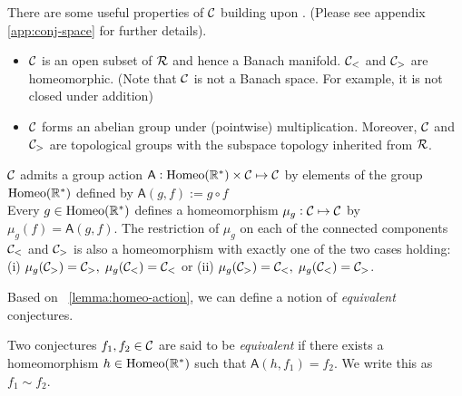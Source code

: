 There are some useful properties of $\mathcal{C}$ building upon \cite{mishraConjGen2023}. (Please see appendix \ref{app:conj-space} for further details).
\begin{itemize}
    \item $\mathcal{C}$ is an open subset of $\mathcal{R}$ and hence a Banach manifold. $\mathcal{C}_{<}$ and $\mathcal{C}_{>}$ are homeomorphic. (Note that $\mathcal{C}$ is not a Banach space. For example, it is not closed under addition)
    \item $\mathcal{C}$ forms an abelian group under (pointwise) multiplication. Moreover, $\mathcal{C}$ and $\mathcal{C}_{>}$ are topological groups with the subspace topology inherited from $\mathcal{R}$. 
\end{itemize}

\begin{lemma}
    \label{lemma:homeo-action}
    $\mathcal{C}$ admits a group action $\mathsf{A}: \text{Homeo}(\mathbb{R}^*)\times\mathcal{C}\mapsto\mathcal{C}$ by elements of the group $\text{Homeo}(\mathbb{R}^*)$ defined by $\mathsf{A}(g,f) := g\circ f$\\
    Every $g\in\text{Homeo}(\mathbb{R}^*)$ defines a homeomorphism $\mu_g : \mathcal{C}\mapsto\mathcal{C}$ by $\mu_g(f) = \mathsf{A}(g,f)$. The restriction of $\mu_g$ on each of the connected components $\mathcal{C}_{<}$ and $\mathcal{C}_{>}$ is also a homeomorphism 
    with exactly one of the two cases holding: (i) $\mu_g(\mathcal{C}_{>}) = \mathcal{C}_{>},\; \mu_g(\mathcal{C}_{<}) = \mathcal{C}_{<}$ or (ii) $\mu_g(\mathcal{C}_{>}) = \mathcal{C}_{<},\; \mu_g(\mathcal{C}_{<}) = \mathcal{C}_{>}$.
\end{lemma}

Based on ~\ref{lemma:homeo-action}, we can define a notion of \textit{equivalent} conjectures.
\begin{definition}
    Two conjectures $f_1,f_2\in\mathcal{C}$ are said to be \textit{equivalent} if there exists a homeomorphism $h\in\text{Homeo}(\mathbb{R}^*)$ such that $\mathsf{A}(h, f_1) = f_2$. We write this as $f_1\sim f_2$.
\end{definition}    

